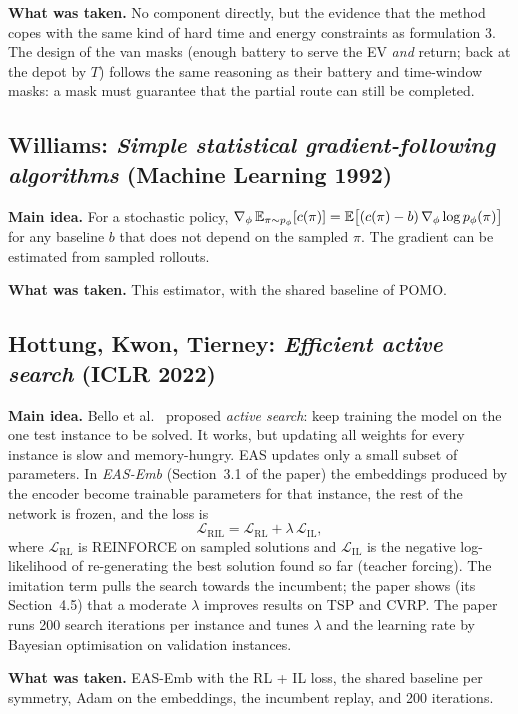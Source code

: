 \textbf{What was taken.} No component directly, but the evidence that the method copes with the same kind of hard time and energy constraints as formulation 3. The design of the van masks (enough battery to serve the EV \emph{and} return; back at the depot by $T$) follows the same reasoning as their battery and time-window masks: a mask must guarantee that the partial route can still be completed.

\subsection{Williams: \emph{Simple statistical gradient-following algorithms} (Machine Learning 1992)}

\textbf{Main idea.} For a stochastic policy, $\nabla_\phi\,\mathbb{E}_{\pi\sim p_\phi}[c(\pi)]=\mathbb{E}\big[(c(\pi)-b)\,\nabla_\phi\log p_\phi(\pi)\big]$ for any baseline $b$ that does not depend on the sampled $\pi$. The gradient can be estimated from sampled rollouts.

\textbf{What was taken.} This estimator, with the shared baseline of POMO.

\subsection{Hottung, Kwon, Tierney: \emph{Efficient active search} (ICLR 2022)}

\textbf{Main idea.} Bello et al.\ \cite{bello2016} proposed \emph{active search}: keep training the model on the one test instance to be solved. It works, but updating all weights for every instance is slow and memory-hungry. EAS updates only a small subset of parameters. In \emph{EAS-Emb} (Section~3.1 of the paper) the embeddings produced by the encoder become trainable parameters for that instance, the rest of the network is frozen, and the loss is
\[
\mathcal L_{\text{RIL}}=\mathcal L_{\text{RL}}+\lambda\,\mathcal L_{\text{IL}},
\]
where $\mathcal L_{\text{RL}}$ is REINFORCE on sampled solutions and $\mathcal L_{\text{IL}}$ is the negative log-likelihood of re-generating the best solution found so far (teacher forcing). The imitation term pulls the search towards the incumbent; the paper shows (its Section~4.5) that a moderate $\lambda$ improves results on TSP and CVRP. The paper runs 200 search iterations per instance and tunes $\lambda$ and the learning rate by Bayesian optimisation on validation instances.

\textbf{What was taken.} EAS-Emb with the RL + IL loss, the shared baseline per symmetry, Adam on the embeddings, the incumbent replay, and 200 iterations.


